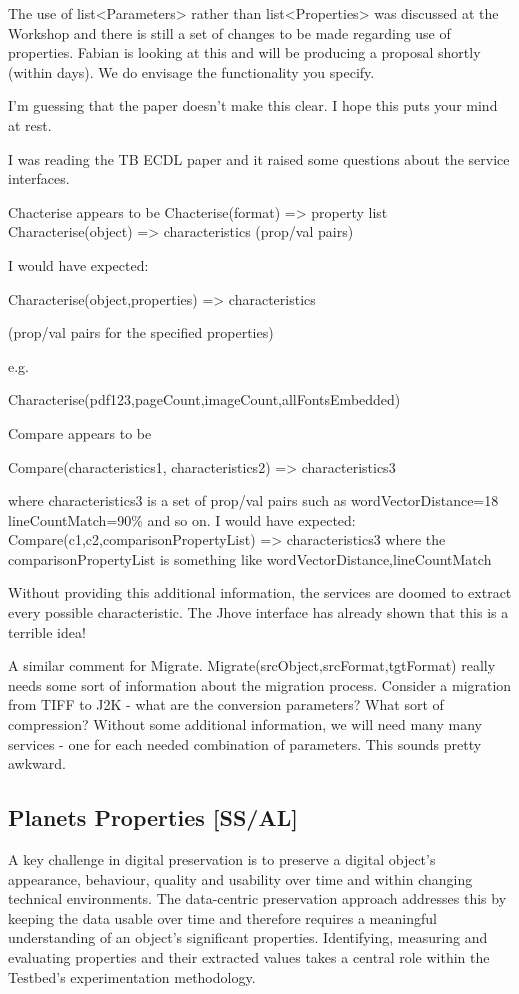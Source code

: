 \documentclass{article}
\begin{document}
The use of list<Parameters> rather than list<Properties> was discussed at the
Workshop and there is still a set of changes to be made regarding use of
properties.  Fabian is looking at this and will be producing a proposal shortly
(within days).  We do envisage the functionality you specify.

I'm guessing that the paper doesn't make this clear.  I hope this puts your
mind at rest.



I was reading the TB ECDL paper and it raised some questions about the service
interfaces.
 
Chacterise appears to be Chacterise(format) => property list Characterise(object)
=> characteristics (prop/val pairs)
 
I would have expected: 

Characterise(object,properties) => characteristics

(prop/val pairs for the specified properties) 

e.g.

Characterise(pdf123,{pageCount,imageCount,allFontsEmbedded})
 
Compare appears to be 

Compare(characteristics1, characteristics2) => characteristics3 

where characteristics3 is a set of prop/val pairs such as
wordVectorDistance=18 lineCountMatch=90\% and so on. I would have expected:
Compare(c1,c2,comparisonPropertyList) => characteristics3 where the
comparisonPropertyList is something like {wordVectorDistance,lineCountMatch}
 
Without providing this additional information, the services are doomed to extract
every possible characteristic.  The Jhove interface has already shown that this
is a terrible idea!
 
A similar comment for Migrate. Migrate(srcObject,srcFormat,tgtFormat) really
needs some sort of information about the migration process.  Consider a migration
from TIFF to J2K - what are the conversion parameters?  What sort of compression?
 Without some additional information, we will need many many services - one for
each needed combination of parameters.  This sounds pretty awkward.

\subsection{Planets Properties [SS/AL]}
\label{ss-planprop}
A key challenge in digital preservation is to preserve a digital object's
appearance, behaviour, quality and usability over time and within changing
technical environments. The data-centric preservation approach addresses this by
keeping the data usable over time and therefore requires a meaningful
understanding of an object's significant properties. Identifying, measuring and
evaluating properties and their extracted values takes a central role within the
Testbed's experimentation methodology.
\end{document}
